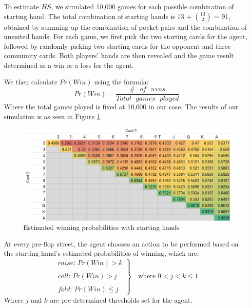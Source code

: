 \documentclass{article}
\begin{document}
To estimate $HS$, we simulated 10,000 games for each possible combination of starting hand. The total combination of starting hands is  13 + ${13 \choose 2}$ = 91, obtained by summing up the combination of pocket pairs and the combination of unsuited hands. For each game, we first pick the two starting cards for the agent, followed by randomly picking two starting cards for the opponent and three community cards. Both players' hands are then revealed and the game result determined as a win or a loss for the agent.

We then calculate $Pr(Win)$ using the formula:
\begin{displaymath}
Pr(Win)= \frac{\# \text{ } of \text{ } wins}{Total \text{ }games \text{ } played}
\end{displaymath}
Where the total games played is fixed at 10,000 in our case. The results of our simulation is as seen in Figure \ref{fig:1}.
\begin{figure}
  \includegraphics[width=\linewidth]{WinningProb.PNG}
  \caption{Estimated winning probabilities with starting hands}
  \label{fig:1}
\end{figure}

At every pre-flop street, the agent chooses an action to be performed based on the starting hand's estimated probabilities of winning, which are:
\begin{displaymath}
  \left.
  \begin{array}{l}
    raise \text{: } Pr(Win) > k \\
    \\
    call \text{: } Pr(Win) > j \\
    \\
    fold \text{: } Pr(Win) \leq j
  \end{array}
  \right\rbrace \quad \text{where } 0 < j < k \leq 1
\end{displaymath}
Where $j$ and $k$ are pre-determined thresholds set for the agent.
\end{document}

